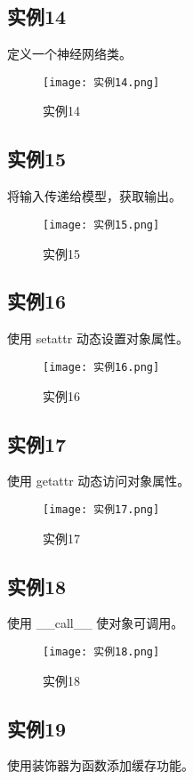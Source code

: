 \documentclass[a4paper, 12pt]{article}
\begin{document}
\subsection{实例14}
定义一个神经网络类。

\begin{figure}[h!]
  \centering
  \texttt{[image: 实例14.png]}
  \caption{实例14}
\end{figure}

\subsection{实例15}
将输入传递给模型，获取输出。

\begin{figure}[h!]
  \centering
  \texttt{[image: 实例15.png]}
  \caption{实例15}
\end{figure}

\subsection{实例16}
使用 setattr 动态设置对象属性。

\begin{figure}[h!]
  \centering
  \texttt{[image: 实例16.png]}
  \caption{实例16}
\end{figure}

\subsection{实例17}
使用 getattr 动态访问对象属性。

\begin{figure}[h!]
  \centering
  \texttt{[image: 实例17.png]}
  \caption{实例17}
\end{figure}

\subsection{实例18}
使用 \_\_call\_\_ 使对象可调用。

\begin{figure}[h!]
  \centering
  \texttt{[image: 实例18.png]}
  \caption{实例18}
\end{figure}

\subsection{实例19}
使用装饰器为函数添加缓存功能。
\end{document}
